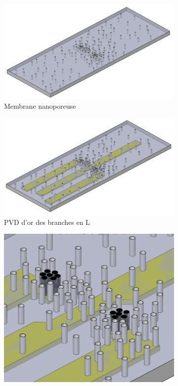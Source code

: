 \begin{itemize}
\begin{figure}[H]
\begin{subfigure}{0.45\textwidth}
                  \includegraphics[scale = 0.35]{assets/figures/Membrane_nue_B.png}
                  \caption{Membrane nanoporeuse}
              \end{subfigure}
              \begin{subfigure}{0.45\textwidth}
                  \includegraphics[scale = 0.35]{assets/figures/PVD_L_B.png}
                  \caption{PVD d'or des branches en L}
              \end{subfigure}
              \newline
              \begin{subfigure}{0.45\textwidth}
                  \includegraphics[scale = 0.35]{assets/figures/ED_B.png}

\end{subfigure}
\end{figure}
\end{itemize}
